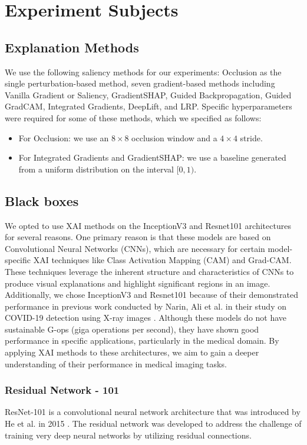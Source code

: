 \section{Experiment Subjects}
\label{sec:experimentSubjects}

\subsection{Explanation Methods}
\label{subsec:explanationMethods}
We use the following saliency methods for our experiments: Occlusion as the single perturbation-based method, seven gradient-based methods including Vanilla Gradient or Saliency, GradientSHAP, Guided Backpropagation, Guided GradCAM, Integrated Gradients, DeepLift, and LRP. Specific hyperparameters were required for some of these methods, which we specified as follows:
\begin{itemize}
    \item For Occlusion: we use an $8\times8$ occlusion window and a $4\times4$ stride.
    \item For Integrated Gradients and GradientSHAP: we use a baseline generated from a uniform distribution on the interval $[0, 1)$.
\end{itemize}

\subsection{Black boxes}
We opted to use XAI methods on the InceptionV3 \cite{inceptionv3} and Resnet101 \cite{resnet101} architectures for several reasons. One primary reason is that these models are based on Convolutional Neural Networks (CNNs), which are necessary for certain model-specific XAI techniques like Class Activation Mapping (CAM) and Grad-CAM. These techniques leverage the inherent structure and characteristics of CNNs to produce visual explanations and highlight significant regions in an image. Additionally, we chose InceptionV3 and Resnet101 because of their demonstrated performance in previous work conducted by Narin, Ali et al. in their study on COVID-19 detection using X-ray images \cite{covidXray}. Although these models do not have sustainable G-ops (giga operations per second), they have shown good performance in specific applications, particularly in the medical domain. By applying XAI methods to these architectures, we aim to gain a deeper understanding of their performance in medical imaging tasks.

\subsubsection{Residual Network - 101}
\label{subsubsec:resnet101}
ResNet-101 is a convolutional neural network architecture that was introduced by He et al. in 2015 \cite{resnet101}. The residual network was developed to address the challenge of training very deep neural networks by utilizing residual connections.

